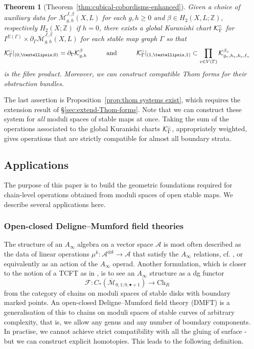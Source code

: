 \documentclass[11pt,psamsfonts, oneside, reqno]{amsart}
\newcommand{\sub}{\subset}%
\newcommand{\p}[2]{\prod\limits_{#1}{#2} }
\newcommand{\cl}{\colon}
\newcommand{\scA}{\mathscr{A}}
\newcommand{\scF}{\mathscr{F}}
\newcommand{\Mbar}{\overline{\mathcal M}}
\newcommand{\del}{\partial}
\newcommand{\bZ}{\mathbb{Z}}
\newcommand{\cK}{\mathcal{K}}
\newtheorem{intthm}{Theorem}
\newcommand{\cKc}{\cK^{\scale{\square}{0.6}}}
\newcommand{\scale}[2]{\scaleobj{#2}{#1}}
\theoremstyle{definition}
\theoremstyle{remark}
\numberwithin{equation}{section}
\begin{document}
\begin{intthm}[Theorem~\ref{thm:cubical-cobordisms-enhanced}]\label{} Given a choice of auxiliary data for $\Mbar_{g,h}^{J,\beta}(X,L)$ for each $g,h\ge 0$ and $\beta\in H_2(X,L;\bZ)$, respectively $H_2(X;\bZ)$ if $h = 0$, there exists a global Kuranishi chart $\cKc_\Gamma$ for $I^{E(\Gamma)}\times \del_\Gamma\Mbar^{J,\beta}_{g,h}(X,L)$ for each stable map graph $\Gamma$ so that 
	\begin{equation*}\label{} \cKc_\Gamma|_{(0,\dots, 0)} = \del_\Gamma\cK_{g,h}^\beta\qquad \quad\text{and}\qquad \quad \cKc_\Gamma|_{(1,\dots, 1)} \sub \p{v\in V(\Gamma)}{\cK_{g_v,h_v,k_v,\ell_v}^{\beta_v}}
	\end{equation*}
	 is the fibre product. Moreover, we can construct compatible Thom forms for their obstruction bundles. 
\end{intthm}

\noindent
The last assertion is Proposition~\ref{prop:thom systems exist}, which requires the extension result of \S\ref{sec:extend-Thom-forms}. Note that we can construct these system for \emph{all} moduli spaces of stable maps at once.
Taking the sum of the operations associated to the global Kuranishi charts $\cKc_\Gamma$, appropriately weighted, gives operations that are strictly compatible for almost all boundary strata. 

\subsection{Applications} The purpose of this paper is to build the geometric foundations required for chain-level operations obtained from moduli spaces of open stable maps. We describe several applications here.

\subsubsection{Open-closed Deligne--Mumford field theories}
The structure of an $A_\infty$ algebra on a vector space $\scA$ is most often described as the data of linear operations $\mu^k \cl \scA^{\otimes k}\to \scA$ that satisfy the $A_\infty$ relations, cf. \cite{Sei08}, or equivalently as an action of the $A_\infty$ operad. Another formulation, which is closer to the notion of a TCFT as in \cite{Cos07}, is to see an $A_\infty$ structure as a dg functor 
\begin{equation}
	\label{} \scF\cl C_*(\Mbar_{0,1;0,\bullet+1}) \to \text{Ch}_R
\end{equation} 
from the category of chains on moduli spaces of stable disks with boundary marked points. An open-closed Deligne--Mumford field theory (DMFT) is a generalisation of this to chains on moduli spaces of stable curves of arbitrary complexity, that is, we allow any genus and any number of boundary components. In practise, we cannot achieve strict compatibility with all the gluing of surface - but we can construct explicit homotopies. This leads to the following definition.
\end{document}
